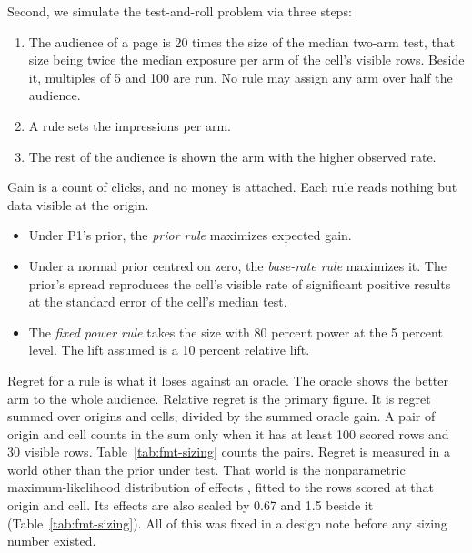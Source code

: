 \documentclass[sigconf,nonacm]{acmart}
\begin{document}
Second, we simulate the test-and-roll problem \cite{feit2019test} via three steps:
\begin{enumerate}
\item The audience of a page is 20 times the size of the median two-arm test, that size being twice the median exposure per arm of the cell's visible rows. Beside it, multiples of 5 and 100 are run. No rule may assign any arm over half the audience.
\item A rule sets the impressions per arm.
\item The rest of the audience is shown the arm with the higher observed rate.
\end{enumerate}
Gain is a count of clicks, and no money is attached. Each rule reads nothing but data visible at the origin.
\begin{itemize}
\item Under P1's prior, the \emph{prior rule} maximizes expected gain.
\item Under a normal prior centred on zero, the \emph{base-rate rule} maximizes it. The prior's spread reproduces the cell's visible rate of significant positive results at the standard error of the cell's median test.
\item The \emph{fixed power rule} takes the size with 80 percent power at the 5 percent level. The lift assumed is a 10 percent relative lift.
\end{itemize}
Regret for a rule is what it loses against an oracle. The oracle shows the better arm to the whole audience. Relative regret is the primary figure. It is regret summed over origins and cells, divided by the summed oracle gain. A pair of origin and cell counts in the sum only when it has at least 100 scored rows and 30 visible rows. Table~\ref{tab:fmt-sizing} counts the pairs. Regret is measured in a world other than the prior under test. That world is the nonparametric maximum-likelihood distribution of effects \cite{kiefer1956consistency}, fitted to the rows scored at that origin and cell. Its effects are also scaled by 0.67 and 1.5 beside it (Table~\ref{tab:fmt-sizing}). All of this was fixed in a design note before any sizing number existed.
\end{document}
